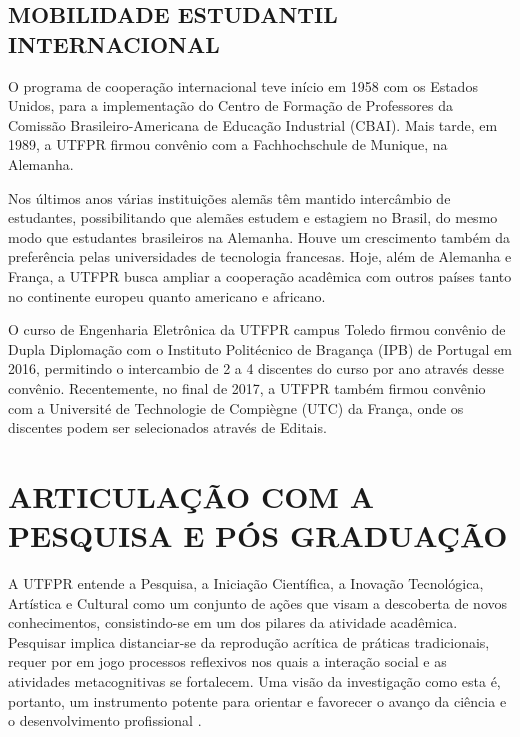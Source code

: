 \subsection{MOBILIDADE ESTUDANTIL INTERNACIONAL}

O programa de cooperação internacional teve início em 1958 com os Estados Unidos, para a implementação do Centro de Formação de Professores da Comissão Brasileiro-Americana de Educação Industrial  (CBAI). Mais tarde, em 1989, a UTFPR firmou convênio com a Fachhochschule de Munique, na Alemanha.


Nos últimos anos várias instituições alemãs têm mantido intercâmbio de estudantes, possibilitando que alemães estudem e estagiem no Brasil, do mesmo modo que estudantes brasileiros na Alemanha. Houve um crescimento também da preferência pelas universidades de tecnologia francesas. Hoje, além de Alemanha e França, a UTFPR busca ampliar a cooperação acadêmica com outros países tanto no continente europeu quanto americano e africano.

O curso de Engenharia Eletrônica da UTFPR campus Toledo firmou convênio de Dupla Diplomação com o Instituto Politécnico de Bragança (IPB) de Portugal em 2016, permitindo o intercambio de 2 a 4 discentes do curso por ano através desse convênio. Recentemente, no final de 2017, a UTFPR também firmou convênio com a Université de Technologie de Compiègne (UTC) da França, onde os discentes podem ser selecionados através de Editais.


\section{ARTICULAÇÃO COM A PESQUISA E PÓS GRADUAÇÃO}
\label{sec:pesq}

A UTFPR entende a Pesquisa, a Iniciação Científica, a Inovação Tecnológica, Artística e Cultural como um conjunto de ações que visam a descoberta de novos conhecimentos, consistindo-se em um dos pilares da atividade acadêmica. Pesquisar implica distanciar-se da reprodução acrítica de práticas tradicionais, requer por em jogo processos reflexivos nos quais a interação social e as atividades metacognitivas se fortalecem. Uma visão da investigação como esta é, portanto, um instrumento potente para orientar e favorecer o avanço da ciência e o desenvolvimento profissional \cite{pizzatoconcepccoes}.

